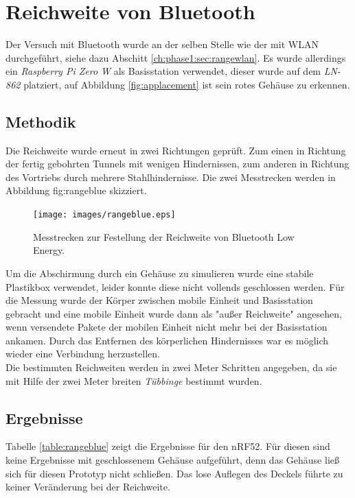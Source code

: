 \section{Reichweite von Bluetooth}
Der Versuch mit Bluetooth wurde an der selben Stelle wie der mit WLAN durchgeführt, siehe dazu Abschitt \ref{ch:phase1:sec:rangewlan}.
Es wurde allerdings ein \emph{Raspberry Pi Zero W} als Basisstation verwendet, dieser wurde auf dem \emph{LN-862} platziert, auf Abbildung \ref{fig:applacement} ist sein rotes Gehäuse zu erkennen.

\subsection{Methodik}
Die Reichweite wurde erneut in zwei Richtungen geprüft. 
Zum einen in Richtung der fertig gebohrten Tunnels mit wenigen Hindernissen, zum anderen in Richtung des Vortriebs durch mehrere Stahlhindernisse.
Die zwei Messtrecken werden in Abbildung {fig:rangeblue} skizziert.

\begin{figure}[h!]
  \centering
	\texttt{[image: images/rangeblue.eps]}
  \caption{Messtrecken zur Festellung der Reichweite von Bluetooth Low Energy.}
  \label{fig:rangeblue}
\end{figure}

Um die Abschirmung durch ein Gehäuse zu simulieren wurde eine stabile Plastikbox verwendet, leider konnte diese nicht vollends geschlossen werden.
Für die Messung wurde der Körper zwischen mobile Einheit und Basisstation gebracht und eine mobile Einheit wurde dann als "außer Reichweite" angesehen, wenn versendete Pakete der mobilen Einheit nicht mehr bei der Basisstation ankamen.
Durch das Entfernen des körperlichen Hindernisses war es möglich wieder eine Verbindung herzustellen.\\
Die bestimmten Reichweiten werden in zwei Meter Schritten angegeben, da sie mit Hilfe der zwei Meter breiten \emph{Tübbinge} bestimmt wurden.

\subsection{Ergebnisse}
Tabelle \ref{table:rangeblue} zeigt die Ergebnisse für den nRF52.
Für diesen sind keine Ergebnisse mit geschlossenem Gehäuse aufgeführt, denn das Gehäuse ließ sich für diesen Prototyp nicht schließen.
Das lose Auflegen des Deckels führte zu keiner Veränderung bei der Reichweite.

